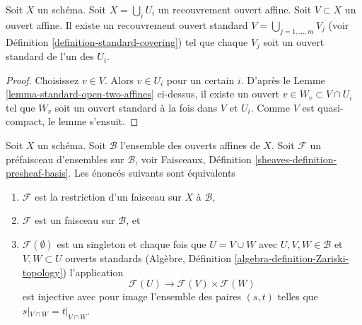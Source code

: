\begin{lemma}
\label{lemma-good-subcover}
Soit  $X$  un schéma. Soit  $X = \bigcup_i U_i$  un recouvrement ouvert affine. Soit
 $V \subset X$  un ouvert affine. Il existe un recouvrement ouvert standard
 $V = \bigcup_{j = 1, \ldots, m} V_j$  (voir Définition  \ref{definition-standard-covering}) tel que chaque  $V_j$  soit
un ouvert standard de l'un des  $U_i$.
\end{lemma}

\begin{proof}
Choisissez  $v \in V$. Alors  $v \in U_i$  pour un certain  $i$. D'après le
Lemme  \ref{lemma-standard-open-two-affines}  ci-dessus, il existe un ouvert  $v \in W_v \subset V \cap U_i$  tel que
 $W_v$  soit un ouvert standard à la fois dans  $V$  et  $U_i$.
Comme  $V$  est quasi-compact, le lemme s'ensuit.
\end{proof}

\begin{lemma}
\label{lemma-sheaf-on-affines}
Soit  $X$  un schéma. Soit  $\mathcal{B}$  l'ensemble des ouverts affines de
 $X$. Soit  $\mathcal{F}$  un préfaisceau d'ensembles sur  $\mathcal{B}$, voir
Faisceaux, Définition  \ref{sheaves-definition-presheaf-basis}. Les énoncés suivants sont équivalents
\begin{enumerate}
\item $\mathcal{F}$  est la restriction d'un faisceau sur  $X$  à  $\mathcal{B}$,
\item $\mathcal{F}$  est un faisceau sur  $\mathcal{B}$, et
\item $\mathcal{F}(\emptyset)$  est un singleton et chaque fois que  $U = V \cup W$  avec  $U, V, W \in \mathcal{B}$  et
 $V, W \subset U$  ouverts standards (Algèbre, Définition  \ref{algebra-definition-Zariski-topology}) l'application
$$
\mathcal{F}(U) \longrightarrow \mathcal{F}(V) \times \mathcal{F}(W)
$$
est injective avec pour image l'ensemble des paires  $(s, t)$  telles que
 $s|_{V \cap W} = t|_{V \cap W}$.
\end{enumerate}
\end{lemma}

